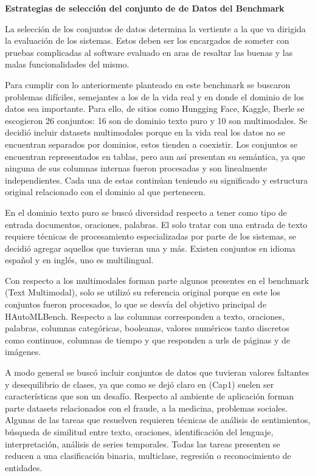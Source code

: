 \begin{flushleft} 
    {\large { \textbf{Estrategias de selección del conjunto de de Datos del Benchmark}}}\label{section:selection}
\end{flushleft}
La selección de los conjuntos de datos determina la vertiente a la que va dirigida la evaluación de los sistemas. Estos deben ser los encargados de someter con 
pruebas complicadas al software evaluado en aras de resaltar las buenas y las malas funcionalidades del mismo.

Para cumplir con lo anteriormente planteado en este benchmark se buscaron problemas difíciles, semejantes a los de la vida real y en donde el dominio de los datos 
sea importante. Para ello, de sitios como Hungging Face, Kaggle, Iberle se escogieron 26 conjuntos: 16 son de dominio texto puro y 10 son multimodales. Se decidió 
incluir datasets multimodales porque en la vida real los datos no se encuentran separados por dominios, estos tienden a coexistir. Los conjuntos se encuentran 
representados en tablas, pero aun así presentan su semántica, ya que ninguna de sus columnas internas fueron procesadas y son linealmente independientes. Cada una de 
estas continúan teniendo su significado y estructura original relacionado con el dominio al que pertenecen.

En el dominio texto puro se buscó diversidad respecto a tener como tipo de entrada documentos, oraciones, palabras. El solo tratar con una entrada de texto requiere 
técnicas de procesamiento especializadas por parte de los sistemas, se decidió agregar aquellos que tuvieran una y más. Existen conjuntos en idioma español y en inglés, 
uno es multilingual.

Con respecto a los multimodales forman parte algunos presentes en el benchmark (Text Multimodal), solo se utilizó su referencia original porque en este los conjuntos 
fueron procesados, lo que se desvía del objetivo principal de HAutoMLBench. Respecto a las columnas corresponden a texto, oraciones, palabras, columnas categóricas, 
booleanas, valores numéricos tanto discretos como continuos, columnas de tiempo y que responden a urls de páginas y de imágenes.

A modo general se buscó incluir conjuntos de datos que tuvieran valores faltantes y desequilibrio de clases, ya que como se dejó claro en (Cap1) suelen ser 
características que son un desafío. Respecto al ambiente de aplicación forman parte datasets relacionados con el fraude, a la medicina, problemas sociales. Algunas de 
las tareas que resuelven requieren técnicas de análisis de sentimientos, búsqueda de similitud entre texto, oraciones, identificación del lenguaje, interpretación, 
análisis de series temporales. Todas las tareas presenten se reducen a una clasificación binaria, multiclase, regresión o reconocimiento de entidades.

